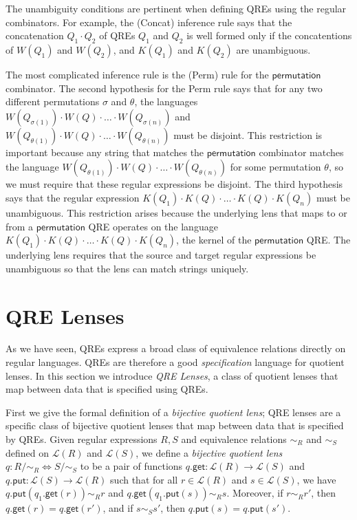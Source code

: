 \documentclass[acmsmall,review,anonymous]{acmart}
\newcommand{\codefont}[1]{\ensuremath{\mathsf{#1}}}
\newcommand{\kw}[1]{\codefont{#1}}
\newcommand{\get}{\ensuremath{\kw{get}}}
\newcommand{\lput}{\ensuremath{\kw{put}}}
\begin{document}
The unambiguity conditions are pertinent when defining QREs using the
regular combinators. For example, the (Concat) inference rule 
says that the concatenation $Q_1 \cdot Q_2$ of QREs
$Q_1$ and $Q_2$ is well formed only if the concatentions of $W(Q_1)$
and $W(Q_2)$, and $K(Q_1)$ and $K(Q_2)$ are unambiguous.

The most complicated inference rule is the (Perm) rule for the
\kw{permutation} combinator. The second hypothesis for the
Perm rule says that for any two different permutations $\sigma$
and $\theta$, the languages $W(Q_{\sigma(1)}) \cdot W(Q) \cdot \ldots \cdot
W(Q_{\sigma(n)})$ and $W(Q_{\theta(1)}) \cdot W(Q) \cdot \ldots \cdot
W(Q_{\theta(n)})$ must be disjoint. This restriction is important
because any string that matches the 
\kw{permutation} combinator matches the language $W(Q_{\theta(1)}) \cdot
W(Q) \cdot \ldots \cdot W(Q_{\theta(n)})$ for some permutation $\theta$, so we
must require that these regular expressions be disjoint.
%
The third hypothesis says that the regular expression $K(Q_1) \cdot K(Q)
\cdot \ldots \cdot K(Q) \cdot K(Q_n)$ must be unambiguous. This
restriction arises because the
underlying lens that maps to or from a \kw{permutation} QRE operates on
the language $K(Q_1) \cdot K(Q) \cdot \ldots \cdot K(Q) \cdot K(Q_n)$, 
the kernel of the \kw{permutation} QRE. The underlying
lens requires that the source and target regular expressions be
unambiguous so that the lens can match strings uniquely.


\section{QRE Lenses}
\label{QRE-lenses}
As we have seen, QREs express a broad class of equivalence relations
directly on regular languages. QREs are therefore a good \textit{specification}
language for quotient lenses. In this section we introduce \textit{QRE Lenses},
a class of quotient lenses that map between data that is specified using QREs.

First we give the formal definition of a {\em bijective quotient lens}; QRE
lenses are a specific class of bijective quotient lenses that map between data
that is specified by QREs. Given regular expressions $R, S$ and equivalence
relations $\sim_R$ and $\sim_S$ defined on $\mathcal{L}(R)$ and $\mathcal{L}(S)$,
we define a {\em bijective quotient lens} $q : R /{\sim_R} \Leftrightarrow
S/{\sim_S}$ to be a pair of functions $q.\get :
\mathcal{L}(R) \longrightarrow \mathcal{L}(S)$ and $q.\lput : \mathcal{L}(S)
\longrightarrow \mathcal{L}(R)$ such that for all $r \in \mathcal{L}(R)$ and $s
\in \mathcal{L}(S)$, we have $q.\lput(q_1.\get(r)) \sim_R r$ and
$q.\get(q_1.\lput(s)) \sim_R s$. Moreover, if $r \sim_R r'$, then $q.\get(r) =
q.\get(r')$, and if $s \sim_S s'$, then $q.\lput(s) = q.\lput(s')$.
\end{document}
